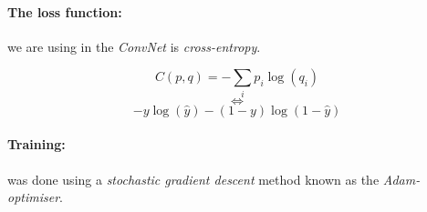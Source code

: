 \documentclass[
    ,title     = {{Methods for image classification}}
    ,longtitle
    ,highlight = dtured
    ,toplogo   = {{template/tex_dtu_compute_b_uk}}
    ,botlogo   = {{template/tex_dtu_frise}}
    ,papersize = {{a0paper}}
    ,colcount  = {{3columns}}
]{dtuposter}
\begin{document}
\begin{minipage}[t]{0.30\textwidth}
\paragraph{The loss function:}
we are using in the \textit{ConvNet} is \textit{cross-entropy}.

\begin{equation}
    C(p,q) = -\sum_{i} p_i \log(q_i)
\end{equation}
$$\Longleftrightarrow$$
\begin{equation}
-y \log( \hat{y}) - (1-y)\log(1-\hat{y})
\end{equation}

\paragraph{Training:}
was done using a \textit{stochastic gradient descent} method known as the \textit{Adam-optimiser}.



\end{minipage}\hfill
\end{document}
